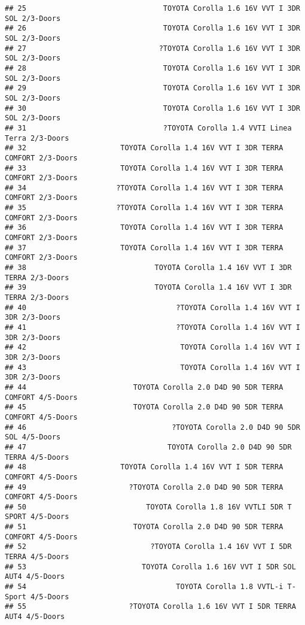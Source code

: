 \documentclass[]{article}
\begin{document}
\begin{verbatim}
## 25                                TOYOTA Corolla 1.6 16V VVT I 3DR SOL 2/3-Doors
## 26                                TOYOTA Corolla 1.6 16V VVT I 3DR SOL 2/3-Doors
## 27                               ?TOYOTA Corolla 1.6 16V VVT I 3DR SOL 2/3-Doors
## 28                                TOYOTA Corolla 1.6 16V VVT I 3DR SOL 2/3-Doors
## 29                                TOYOTA Corolla 1.6 16V VVT I 3DR SOL 2/3-Doors
## 30                                TOYOTA Corolla 1.6 16V VVT I 3DR SOL 2/3-Doors
## 31                                ?TOYOTA Corolla 1.4 VVTI Linea Terra 2/3-Doors
## 32                      TOYOTA Corolla 1.4 16V VVT I 3DR TERRA COMFORT 2/3-Doors
## 33                      TOYOTA Corolla 1.4 16V VVT I 3DR TERRA COMFORT 2/3-Doors
## 34                     ?TOYOTA Corolla 1.4 16V VVT I 3DR TERRA COMFORT 2/3-Doors
## 35                     ?TOYOTA Corolla 1.4 16V VVT I 3DR TERRA COMFORT 2/3-Doors
## 36                      TOYOTA Corolla 1.4 16V VVT I 3DR TERRA COMFORT 2/3-Doors
## 37                      TOYOTA Corolla 1.4 16V VVT I 3DR TERRA COMFORT 2/3-Doors
## 38                              TOYOTA Corolla 1.4 16V VVT I 3DR TERRA 2/3-Doors
## 39                              TOYOTA Corolla 1.4 16V VVT I 3DR TERRA 2/3-Doors
## 40                                   ?TOYOTA Corolla 1.4 16V VVT I 3DR 2/3-Doors
## 41                                   ?TOYOTA Corolla 1.4 16V VVT I 3DR 2/3-Doors
## 42                                    TOYOTA Corolla 1.4 16V VVT I 3DR 2/3-Doors
## 43                                    TOYOTA Corolla 1.4 16V VVT I 3DR 2/3-Doors
## 44                         TOYOTA Corolla 2.0 D4D 90 5DR TERRA COMFORT 4/5-Doors
## 45                         TOYOTA Corolla 2.0 D4D 90 5DR TERRA COMFORT 4/5-Doors
## 46                                  ?TOYOTA Corolla 2.0 D4D 90 5DR SOL 4/5-Doors
## 47                                 TOYOTA Corolla 2.0 D4D 90 5DR TERRA 4/5-Doors
## 48                      TOYOTA Corolla 1.4 16V VVT I 5DR TERRA COMFORT 4/5-Doors
## 49                        ?TOYOTA Corolla 2.0 D4D 90 5DR TERRA COMFORT 4/5-Doors
## 50                            TOYOTA Corolla 1.8 16V VVTLI 5DR T SPORT 4/5-Doors
## 51                         TOYOTA Corolla 2.0 D4D 90 5DR TERRA COMFORT 4/5-Doors
## 52                             ?TOYOTA Corolla 1.4 16V VVT I 5DR TERRA 4/5-Doors
## 53                           TOYOTA Corolla 1.6 16V VVT I 5DR SOL AUT4 4/5-Doors
## 54                                   TOYOTA Corolla 1.8 VVTL-i T-Sport 4/5-Doors
## 55                        ?TOYOTA Corolla 1.6 16V VVT I 5DR TERRA AUT4 4/5-Doors

\end{verbatim}
\end{document}
